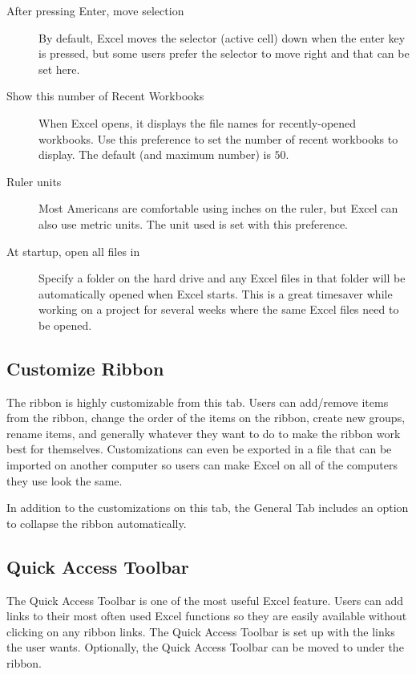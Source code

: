 	\begin{description}
		\item[After pressing Enter, move selection] By default, Excel moves the selector (active cell) down when the enter key is pressed, but some users prefer the selector to move right and that can be set here.
		\item[Show this number of Recent Workbooks] When Excel opens, it displays the file names for recently-opened workbooks. Use this preference to set the number of recent workbooks to display. The default (and maximum number) is $ 50 $.
		\item[Ruler units] Most Americans are comfortable using inches on the ruler, but Excel can also use metric units. The unit used is set with this preference.
		\item[At startup, open all files in] Specify a folder on the hard drive and any Excel files in that folder will be automatically opened when Excel starts. This is a great timesaver while working on a project for several weeks where the same Excel files need to be opened.
	\end{description}
	
\subsection{Customize Ribbon}

The ribbon is highly customizable from this tab. Users can add/remove items from the ribbon, change the order of the items on the ribbon, create new groups, rename items, and generally whatever they want to do to make the ribbon work best for themselves. Customizations can even be exported in a file that can be imported on another computer so users can make Excel on all of the computers they use look the same.

In addition to the customizations on this tab, the General Tab includes an option to collapse the ribbon automatically.

\subsection{Quick Access Toolbar}

The Quick Access Toolbar is one of the most useful Excel feature. Users can add links to their most often used Excel functions so they are easily available without clicking on any ribbon links. The Quick Access Toolbar is set up with the links the user wants. Optionally, the Quick Access Toolbar can be moved to under the ribbon.

